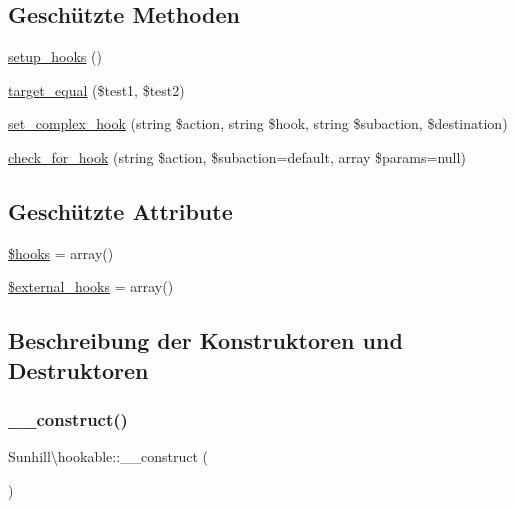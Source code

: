 \subsection*{Geschützte Methoden}
\begin{DoxyCompactItemize}
\item 
\hyperlink{classSunhill_1_1hookable_abce698e1fc883293cb87fde012edd694}{setup\+\_\+hooks} ()
\item 
\hyperlink{classSunhill_1_1hookable_aab7306fb78336e05c8ce29029a6aeaac}{target\+\_\+equal} (\$test1, \$test2)
\item 
\hyperlink{classSunhill_1_1hookable_a4b13c00b8548dd7c9a52f8d744692fa6}{set\+\_\+complex\+\_\+hook} (string \$action, string \$hook, string \$subaction, \$destination)
\item 
\hyperlink{classSunhill_1_1hookable_afa8a307bd31c8b3c55b3bf85d578eaff}{check\+\_\+for\+\_\+hook} (string \$action, \$subaction=\textquotesingle{}default\textquotesingle{}, array \$params=null)
\end{DoxyCompactItemize}
\subsection*{Geschützte Attribute}
\begin{DoxyCompactItemize}
\item 
\hyperlink{classSunhill_1_1hookable_a71e8b41eccb8d8d44530ebf7a7e766f3}{\$hooks} = array()
\item 
\hyperlink{classSunhill_1_1hookable_af1c94c0971832ccbf514b37cdcd78ed2}{\$external\+\_\+hooks} = array()
\end{DoxyCompactItemize}


\subsection{Beschreibung der Konstruktoren und Destruktoren}
\mbox{\label{classSunhill_1_1hookable_ad738a53d0d89572f8ab13c90d6e93884}} 
\subsubsection{\texorpdfstring{\+\_\+\+\_\+construct()}{\_\_construct()}}
{\footnotesize\ttfamily Sunhill\textbackslash{}hookable\+::\+\_\+\+\_\+construct (\begin{DoxyParamCaption}{ }\end{DoxyParamCaption})}



